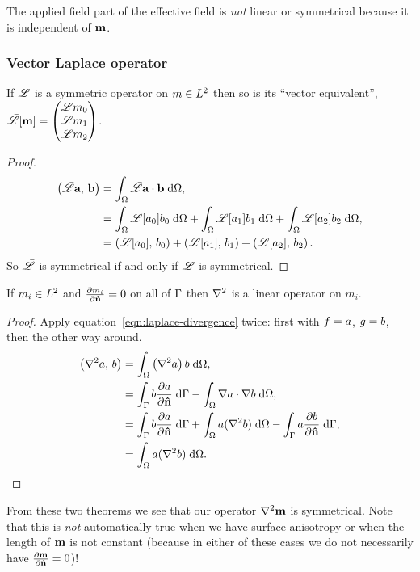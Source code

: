 The applied field part of the effective field is \emph{not} linear or symmetrical because it is independent of $\mv$.

\subsubsection{Vector Laplace operator}

\begin{theorem}
  If $\lop$ is a symmetric operator on $m \in \ltwo$ then so is its ``vector equivalent'', $\bar{\lop}[\mv] = \threevec{\lop m_0}{\lop m_1}{\lop m_2}$.
\end{theorem}

\begin{proof}
  \begin{equation}
    \begin{aligned}
      \ip{\bar{\lop}\av}{\bv} &= \intd{ \bar{\lop} \av \cdot \bv}, \\
      &= \intd{\lop[a_0] b_0} + \intd{\lop[a_1] b_1} + \intd{\lop[a_2] b_2}, \\
      & = \ip{\lop[a_0]}{b_0} + \ip{\lop[a_1]}{b_1} + \ip{\lop[a_2]}{b_2}.
    \end{aligned}
  \end{equation}
  So $\bar{\lop}$ is symmetrical if and only if $\lop$ is symmetrical.
\end{proof}

\begin{theorem}
  If $m_i \in \ltwo$ and $\ddn{m_i} = 0$ on all of $\boundd$ then $\lap$ is a linear operator on $m_i$.
\end{theorem}
\begin{proof}
  Apply equation~\eqref{eqn:laplace-divergence} twice: first with $\ff = a$, $\gf = b$, then the other way around.
  \begin{equation}
    \begin{aligned}
      \ip{\lap a}{b} &= \intd{\left(\lap a \right) b}, \\
      &= \intb{b \ddn{a}} - \intd{\nabla a \cdot \nabla b}, \\
      &= \intb{b \ddn{a}} + \intd{a (\lap b)} - \intb{a \ddn{b}}, \\
      &= \intd{a (\lap b)}.
    \end{aligned}
  \end{equation}
\end{proof}

From these two theorems we see that our operator $\lap \mv$ is symmetrical. Note that this is \emph{not} automatically true when we have surface anisotropy or when the length of $\mv$ is not constant (because in either of these cases we do not necessarily have $\ddn{\mv} = 0$)!

